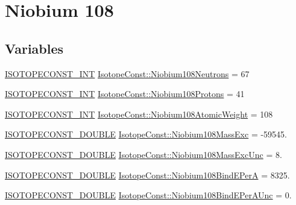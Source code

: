 \hypertarget{group___isotope_const-_niobium-_nb108}{}\section{Niobium 108}
\label{group___isotope_const-_niobium-_nb108}
\subsection*{Variables}
\begin{DoxyCompactItemize}
\item 
\mbox{\hyperlink{group___isotope_const-_macros_ga5f18360b3e99483a35c32d789e62621c}{I\+S\+O\+T\+O\+P\+E\+C\+O\+N\+S\+T\+\_\+\+I\+NT}} \mbox{\hyperlink{group___isotope_const-_niobium-_nb108_ga6ece12d8ae0cd6433fe5ae746fcd9c46}{Isotope\+Const\+::\+Niobium108\+Neutrons}} = 67
\item 
\mbox{\hyperlink{group___isotope_const-_macros_ga5f18360b3e99483a35c32d789e62621c}{I\+S\+O\+T\+O\+P\+E\+C\+O\+N\+S\+T\+\_\+\+I\+NT}} \mbox{\hyperlink{group___isotope_const-_niobium-_nb108_gac71e9903027e8c978f4e19f4f2e42629}{Isotope\+Const\+::\+Niobium108\+Protons}} = 41
\item 
\mbox{\hyperlink{group___isotope_const-_macros_ga5f18360b3e99483a35c32d789e62621c}{I\+S\+O\+T\+O\+P\+E\+C\+O\+N\+S\+T\+\_\+\+I\+NT}} \mbox{\hyperlink{group___isotope_const-_niobium-_nb108_ga152f53c33718aa860f5acb3443edd3d3}{Isotope\+Const\+::\+Niobium108\+Atomic\+Weight}} = 108
\item 
\mbox{\hyperlink{group___isotope_const-_macros_ga8f45a7272ce02c0b4c65c44636ed719a}{I\+S\+O\+T\+O\+P\+E\+C\+O\+N\+S\+T\+\_\+\+D\+O\+U\+B\+LE}} \mbox{\hyperlink{group___isotope_const-_niobium-_nb108_gad38a57828fa0ccc697cec3d73065b8e4}{Isotope\+Const\+::\+Niobium108\+Mass\+Exc}} = -\/59545.
\item 
\mbox{\hyperlink{group___isotope_const-_macros_ga8f45a7272ce02c0b4c65c44636ed719a}{I\+S\+O\+T\+O\+P\+E\+C\+O\+N\+S\+T\+\_\+\+D\+O\+U\+B\+LE}} \mbox{\hyperlink{group___isotope_const-_niobium-_nb108_gad1cad19eb962d98c0203ccd77cba876a}{Isotope\+Const\+::\+Niobium108\+Mass\+Exc\+Unc}} = 8.
\item 
\mbox{\hyperlink{group___isotope_const-_macros_ga8f45a7272ce02c0b4c65c44636ed719a}{I\+S\+O\+T\+O\+P\+E\+C\+O\+N\+S\+T\+\_\+\+D\+O\+U\+B\+LE}} \mbox{\hyperlink{group___isotope_const-_niobium-_nb108_gad8cb7fed4bd6c3e940a330ea9d121997}{Isotope\+Const\+::\+Niobium108\+Bind\+E\+PerA}} = 8325.
\item 
\mbox{\hyperlink{group___isotope_const-_macros_ga8f45a7272ce02c0b4c65c44636ed719a}{I\+S\+O\+T\+O\+P\+E\+C\+O\+N\+S\+T\+\_\+\+D\+O\+U\+B\+LE}} \mbox{\hyperlink{group___isotope_const-_niobium-_nb108_ga70f0234509309ac8fdeda46388f44263}{Isotope\+Const\+::\+Niobium108\+Bind\+E\+Per\+A\+Unc}} = 0.

\end{DoxyCompactItemize}
